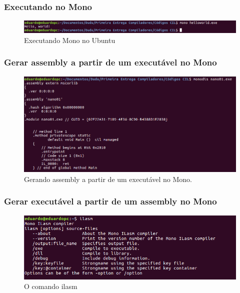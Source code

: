 \documentclass[hidelinks,12pt]{article}
\begin{document}
	\subsubsection{Executando no Mono}
	
	\begin{figure}[h!]
	\centering
	\includegraphics[scale=0.5]{Figures/executarmono}
	\caption{Executando Mono no Ubuntu}
	\end{figure}
	
	\subsubsection{Gerar assembly a partir de um executável no Mono}
	
	\begin{figure}[h!]
	\centering
	\includegraphics[scale=0.5]{Figures/exeparaassemblymono}
	\caption{Gerando assembly a partir de um executável no Mono.}
	\end{figure}
	
	\newpage
	\subsubsection{Gerar executável a partir de um assembly no Mono}
	\begin{figure}[h!]
	\centering
	\includegraphics[scale=0.5]{Figures/ilasm}
	\caption{O comando ilasm}
	\end{figure}
	
\end{document}
